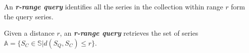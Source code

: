 An \textit{\textbf{r-range query}} identifies all the series in the collection within range $r$ form the query series.

\begin{defn} \label{def:rquery}
Given a distance $r$, an \textit{\textbf{r-range query}} retrieves the set of series $\mathbb{A} = \{S_C \in \mathbb{S} | d(S_Q,S_C) \leq r\}$.
\end{defn}



